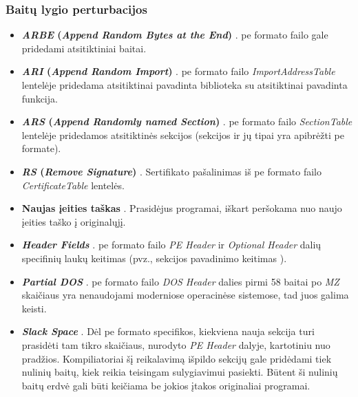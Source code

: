 \subsubsection{Baitų lygio perturbacijos}\label{sec:literature:perturbations:byte}
\begin{itemize}
    \item \textbf{\textit{ARBE} (\textit{Append Random Bytes at the End})} \cite{fangEvadingMalwareEngines2019}. \acs{pe} formato failo gale pridedami atsitiktiniai baitai.
    \item \textbf{\textit{ARI} (\textit{Append Random Import})} \cite{fangEvadingMalwareEngines2019}. \acs{pe} formato failo \textit{ImportAddressTable} lentelėje pridedama atsitiktinai pavadinta biblioteka su atsitiktinai pavadinta funkcija.
    \item \textbf{\textit{ARS} (\textit{Append Randomly named Section})} \cite{fangEvadingMalwareEngines2019}. \acs{pe} formato failo \textit{SectionTable} lentelėje pridedamos atsitiktinės sekcijos (sekcijos ir jų tipai yra apibrėžti \acs{pe} formate).
    \item \textbf{\textit{RS} (\textit{Remove Signature})} \cite{fangEvadingMalwareEngines2019}. Sertifikato pašalinimas iš \acs{pe} formato failo \textit{CertificateTable} lentelės.
    \item \textbf{Naujas įeities taškas} \cite{andersonLearningEvadeStatic2018}. Prasidėjus programai, iškart peršokama nuo naujo įeities taško į originalųjį.
    \item \textbf{\textit{Header Fields}} \cite{demetrioAdversarialEXEmplesSurvey2021}. \acs{pe} formato failo \textit{PE Header} ir \textit{Optional Header} dalių specifinių laukų keitimas (pvz., sekcijos pavadinimo keitimas \cite{andersonLearningEvadeStatic2018}).
    \item \textbf{\textit{Partial DOS}} \cite{demetrioAdversarialEXEmplesSurvey2021}. \acs{pe} formato failo \textit{DOS Header} dalies pirmi 58 baitai po \textit{MZ} skaičiaus yra nenaudojami moderniose operacinėse sistemose, tad juos galima keisti.
    \item \textbf{\textit{Slack Space}} \cite{demetrioAdversarialEXEmplesSurvey2021}. Dėl \acs{pe} formato specifikos, kiekviena nauja sekcija turi prasidėti tam tikro skaičiaus, nurodyto \textit{PE Header} dalyje, kartotiniu nuo pradžios. Kompiliatoriai šį reikalavimą išpildo sekcijų gale pridėdami tiek nulinių baitų, kiek reikia teisingam sulygiavimui pasiekti. Būtent ši nulinių baitų erdvė gali būti keičiama be jokios įtakos originaliai programai.

\end{itemize}
